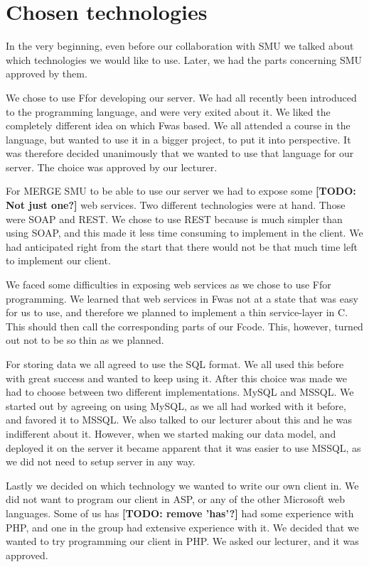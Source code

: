 \section{Chosen technologies}
In the very beginning, even before our collaboration with SMU we talked about which technologies we would like to use. Later, we had the parts concerning SMU approved by them.

We chose to use F\Sh for developing our server. We had all recently been introduced to the programming language, and were very exited about it. We liked the completely different idea on which F\Sh was based. We all attended a course in the language, but wanted to use it in a bigger project, to put it into perspective. It was therefore decided unanimously that we wanted to use that language for our server. The choice was approved by our lecturer.

For   MERGE SMU to be able to use our server we had to expose some \textbf{[TODO: Not just one?]} web services. Two different technologies were at hand. Those were SOAP and REST. We chose to use REST because is much simpler than using SOAP, and this made it less time consuming to implement in the client. We had anticipated right from the start that there would not be that much time left to implement our client.

We faced some difficulties in exposing web services as we chose to use F\Sh for programming. We learned that web services in F\Sh was not at a state that was easy for us to use, and therefore we planned to implement a thin service-layer in C\Sh. This should then call the corresponding parts of our F\Sh code. This, however, turned out not to be so thin as we planned.

For storing data we all agreed to use the SQL format. We all used this before with great success and wanted to keep using it. After this choice was made we had to choose between two different implementations. MySQL and MSSQL. We started out by agreeing on using MySQL, as we all had worked with it before, and favored it to MSSQL. We also talked to our lecturer about this and he was indifferent about it. However, when we started making our data model, and deployed it on the server it became apparent that it was easier to use MSSQL, as we did not need to setup server in any way.

Lastly we decided on which technology we wanted to write our own client in. We did not want to program our client in ASP, or any of the other Microsoft web languages. Some of us has \textbf{[TODO: remove 'has'?]} had some experience with PHP, and one in the group had extensive experience with it. We decided that we wanted to try programming our client in PHP. We asked our lecturer, and it was approved.
\newpage
